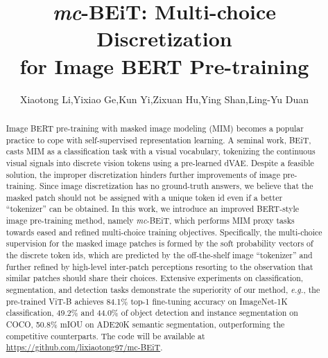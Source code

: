 \documentclass[runningheads]{llncs}
\begin{document}
\pagestyle{headings}
\def\ECCVSubNumber{1197}  

\title{\emph{mc}-BEiT: Multi-choice Discretization \\for Image BERT Pre-training}


\author{{Xiaotong Li{},Yixiao Ge{},Kun Yi{},Zixuan Hu{},Ying Shan{},Ling-Yu Duan{}
} \\
}
\maketitle

\begin{abstract}
Image BERT pre-training with masked image modeling (MIM) becomes a popular practice to cope with self-supervised representation learning.
A seminal work, BEiT, casts MIM as a classification task with a visual vocabulary, tokenizing the continuous visual signals into discrete vision tokens using a pre-learned dVAE. 
Despite a feasible solution, the improper discretization hinders further improvements of image pre-training.
Since image discretization has no ground-truth answers, we believe that the masked patch should not be assigned with a unique token id even if a better ``tokenizer'' can be obtained.
In this work, we introduce an improved BERT-style image pre-training method, namely \emph{mc}-BEiT, which performs MIM proxy tasks towards eased and refined multi-choice training objectives.
Specifically, the multi-choice supervision for the masked image patches is formed by the soft probability vectors of the discrete token ids, which are predicted by the off-the-shelf image ``tokenizer'' and further refined by high-level inter-patch perceptions resorting to the observation that similar patches should share their choices. 
Extensive experiments on classification, segmentation, and detection tasks demonstrate the superiority of our method, \textit{e.g.}, the pre-trained ViT-B achieves 84.1\% top-1 fine-tuning accuracy on ImageNet-1K classification, 49.2\%  and 44.0\%  of object detection and instance segmentation on COCO, 50.8\% mIOU on ADE20K semantic segmentation, outperforming the competitive counterparts. The code will be available at \href{https://github.com/lixiaotong97/mc-BEiT}{https://github.com/lixiaotong97/mc-BEiT}. 

\end{abstract}
\end{document}
